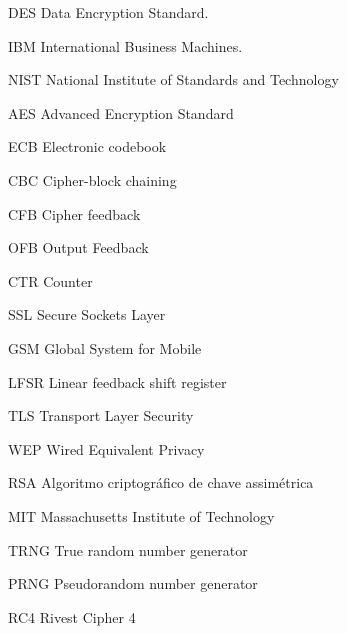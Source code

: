 \begin{siglas}
  \item[DES] Data Encryption Standard.
  \item[IBM] International Business Machines.
  \item[NIST] National Institute of Standards and Technology
  \item[AES] Advanced Encryption Standard
  \item[ECB] Electronic codebook
  \item[CBC] Cipher-block chaining
  \item[CFB] Cipher feedback
  \item[OFB] Output Feedback
  \item[CTR] Counter
  \item[SSL] Secure Sockets Layer
  \item[GSM] Global System for Mobile
  \item[LFSR] Linear feedback shift register
  \item[TLS] Transport Layer Security
  \item[WEP] Wired Equivalent Privacy
  \item[RSA] Algoritmo criptográfico de chave assimétrica
  \item[MIT] Massachusetts Institute of Technology
  \item[TRNG] True random number generator
  \item[PRNG] Pseudorandom number generator
  \item[RC4] Rivest Cipher 4
\end{siglas}
